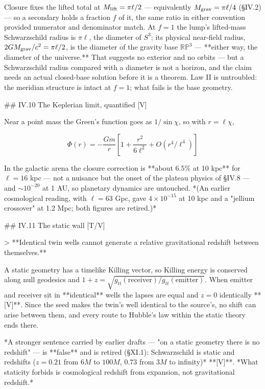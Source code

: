 Closure fixes the lifted total at $M_{\rm lift} = \pi\ell/2$ — equivalently $M_{\rm grav} = \pi\ell/4$ (§IV.2) — so a secondary holds a fraction $f$ of it, the same ratio in either convention provided numerator and denominator match. At $f = 1$ the lump's lifted-mass Schwarzschild radius is $\pi\ell$, the diameter of $S^3$; its physical near-field radius, $2GM_{\rm grav}/c^2 = \pi\ell/2$, is the diameter of the gravity base $\mathbb{RP}^3$ — **either way, the diameter of the universe.** That suggests no exterior and no orbits — but a Schwarzschild radius compared with a diameter is not a horizon, and the claim needs an actual closed-base solution before it is a theorem. Law II is untroubled: the meridian structure is intact at $f = 1$; what fails is the base geometry.

## IV.10 The Keplerian limit, quantified [V]

Near a point mass the Green's function goes as $1/\sin\chi$, so with $r = \ell\chi$,

$$\Phi(r) = -\frac{Gm}{r}\left[1+\frac{r^2}{6\ell^2}+O(r^4/\ell^4)\right]$$

In the galactic arena the closure correction is **about $6.5\%$ at 10 kpc** for $\ell = 16$ kpc — not a nuisance but the onset of the plateau physics of §IV.8 — and $\sim10^{-20}$ at 1 AU, so planetary dynamics are untouched. *(An earlier cosmological reading, with $\ell = 63$ Gpc, gave $4\times10^{-15}$ at 10 kpc and a "jellium crossover" at 1.2 Mpc; both figures are retired.)*

## IV.11 The static wall [T/V]

> **Identical twin wells cannot generate a relative gravitational redshift between themselves.**

A static geometry has a timelike Killing vector, so Killing energy is conserved along null geodesics and $1+z = \sqrt{g_{tt}(\text{receiver})/g_{tt}(\text{emitter})}$. When emitter and receiver sit in **identical** wells the lapses are equal and $z = 0$ identically **[V]**. Since the seed makes the twin's well identical to the source's, no shift can arise between them, and every route to Hubble's law within the static theory ends there.

*A stronger sentence carried by earlier drafts — "on a static geometry there is no redshift" — is **false** and is retired (§XI.1): Schwarzschild is static and redshifts ($z = 0.21$ from $6M$ to $100M$, $0.73$ from $3M$ to infinity)* **[V]**. *What staticity forbids is cosmological redshift from expansion, not gravitational redshift.*

